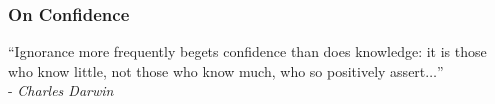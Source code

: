 %

\begin{frame}
  \frametitle{On Confidence}
  ``Ignorance more frequently begets confidence than does knowledge: it is those who know little, not those who know much, who so positively assert$\ldots$'' \\
  - \textit{Charles Darwin}
\end{frame}